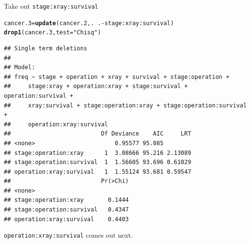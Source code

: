 \documentclass[unknownkeysallowed]{beamer}\usepackage[]{graphicx}\usepackage[]{color}
\makeatletter
\newcommand{\hlstr}[1]{\textcolor[rgb]{0.192,0.494,0.8}{#1}}%
\newcommand{\hlopt}[1]{\textcolor[rgb]{0,0,0}{#1}}%
\newcommand{\hlstd}[1]{\textcolor[rgb]{0.345,0.345,0.345}{#1}}%
\newcommand{\hlkwb}[1]{\textcolor[rgb]{0.69,0.353,0.396}{#1}}%
\newcommand{\hlkwc}[1]{\textcolor[rgb]{0.333,0.667,0.333}{#1}}%
\newcommand{\hlkwd}[1]{\textcolor[rgb]{0.737,0.353,0.396}{\textbf{#1}}}%
\newenvironment{kframe}{%
 \def\at@end@of@kframe{}%
 \ifinner\ifhmode%
  \def\at@end@of@kframe{\end{minipage}}%
  \begin{minipage}{\columnwidth}%
 \fi\fi%
 \def\FrameCommand##1{\hskip\@totalleftmargin \hskip-\fboxsep
 \colorbox{shadecolor}{##1}\hskip-\fboxsep
     \hskip-\linewidth \hskip-\@totalleftmargin \hskip\columnwidth}%
 \MakeFramed {\advance\hsize-\width
   \@totalleftmargin\z@ \linewidth\hsize
   \@setminipage}}%
 {\par\unskip\endMakeFramed%
 \at@end@of@kframe}
\newenvironment{knitrout}{}{} %
\makeatother
\begin{document}
\begin{frame}[fragile]{Take out \texttt{stage:xray:survival}}
    
\begin{knitrout}\scriptsize
{}\color{fgcolor}\begin{kframe}
\begin{alltt}
\hlstd{cancer.3}\hlkwb{=}\hlkwd{update}\hlstd{(cancer.2,.}\hlopt{~}\hlstd{.}\hlopt{-}\hlstd{stage}\hlopt{:}\hlstd{xray}\hlopt{:}\hlstd{survival)}
\hlkwd{drop1}\hlstd{(cancer.3,}\hlkwc{test}\hlstd{=}\hlstr{"Chisq"}\hlstd{)}
\end{alltt}
\begin{verbatim}
## Single term deletions
## 
## Model:
## freq ~ stage + operation + xray + survival + stage:operation + 
##     stage:xray + operation:xray + stage:survival + operation:survival + 
##     xray:survival + stage:operation:xray + stage:operation:survival + 
##     operation:xray:survival
##                          Df Deviance    AIC     LRT
## <none>                       0.95577 95.085        
## stage:operation:xray      1  3.08666 95.216 2.13089
## stage:operation:survival  1  1.56605 93.696 0.61029
## operation:xray:survival   1  1.55124 93.681 0.59547
##                          Pr(>Chi)
## <none>                           
## stage:operation:xray       0.1444
## stage:operation:survival   0.4347
## operation:xray:survival    0.4403
\end{verbatim}
\end{kframe}
\end{knitrout}

\texttt{operation:xray:survival} comes out next.
   
\end{frame}
\end{document}
